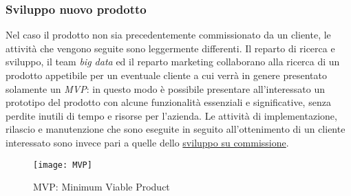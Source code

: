 \subsubsection{Sviluppo nuovo prodotto}
Nel caso il prodotto non sia precedentemente commissionato da un cliente, le attività che vengono seguite sono leggermente differenti. Il reparto di ricerca e sviluppo, il team \textit{big data} ed il reparto marketing collaborano alla ricerca di un prodotto appetibile per un eventuale cliente a cui verrà in genere presentato solamente un \textit{\gls{MVP}}: in questo modo è possibile presentare all'interessato un prototipo del prodotto con alcune funzionalità essenziali e significative, senza perdite inutili di tempo e risorse per l'azienda. Le attività di implementazione, rilascio e manutenzione che sono eseguite in seguito all'ottenimento di un cliente interessato sono invece pari a quelle dello \hyperref[commissione]{sviluppo su commissione}.
\begin{figure}[!h] 
	\centering 
	\texttt{[image: MVP]} 
	\caption{MVP: Minimum Viable Product}
\end{figure}

